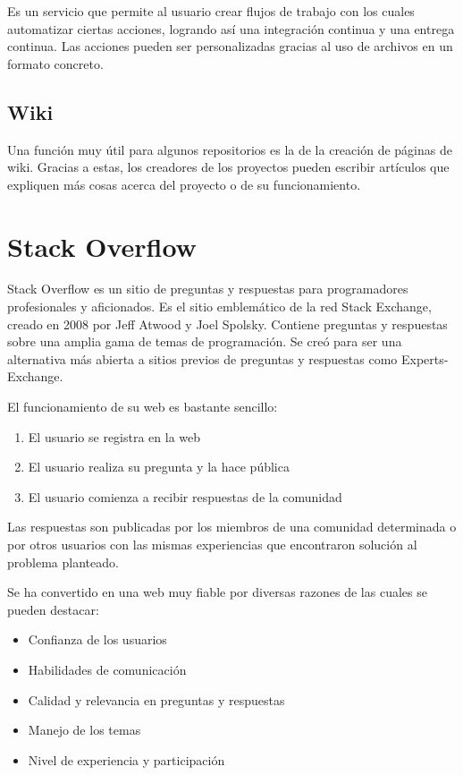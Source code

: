 \documentclass[a4paper, 12pt]{book}
\begin{document}
Es un servicio que permite al usuario crear flujos de trabajo con los cuales automatizar ciertas acciones, logrando así una integración continua y una entrega continua. Las acciones pueden ser personalizadas gracias al uso de archivos en un formato concreto.

\subsection{Wiki}

Una función muy útil para algunos repositorios es la de la creación de páginas de wiki. Gracias a estas, los creadores de los proyectos pueden escribir artículos que expliquen más cosas acerca del proyecto o de su funcionamiento.

\section{Stack Overflow}
\label{Stack Overflow}

Stack Overflow\cite{website:StackOverflow} es un sitio de preguntas y respuestas para programadores profesionales y aficionados. Es el sitio emblemático de la red Stack Exchange, creado en 2008 por Jeff Atwood y Joel Spolsky. Contiene preguntas y respuestas sobre una amplia gama de temas de programación. Se creó para ser una alternativa más abierta a sitios previos de preguntas y respuestas como Experts-Exchange.

El funcionamiento de su web es bastante sencillo:
\begin{enumerate}
	\item El usuario se registra en la web
	\item El usuario realiza su pregunta y la hace pública
	\item El usuario comienza a recibir respuestas de la comunidad
\end{enumerate}

Las respuestas son publicadas por los miembros de una comunidad determinada o por otros usuarios con las mismas experiencias que encontraron solución al problema planteado.

Se ha convertido en una web muy fiable por diversas razones de las cuales se pueden destacar:

\begin{itemize}
	\item Confianza de los usuarios
	\item Habilidades de comunicación
	\item Calidad y relevancia en preguntas y respuestas
	\item Manejo de los temas
	\item Nivel de experiencia y participación
\end{itemize}
\end{document}

